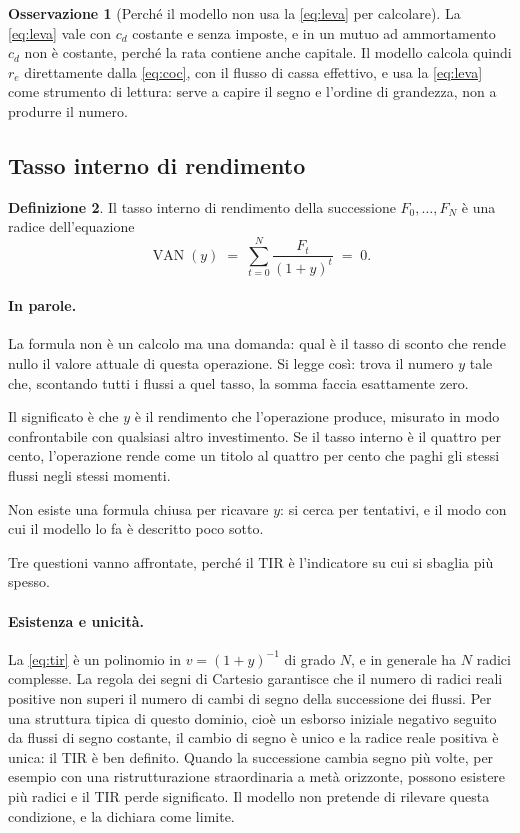 \documentclass[11pt,a4paper]{article}
\theoremstyle{definition}
\newtheorem{definizione}{Definizione}[section]
\newtheorem{osservazione}[definizione]{Osservazione}
\theoremstyle{plain}
\DeclareMathOperator{\VAN}{VAN}
\begin{document}
\begin{osservazione}[Perché il modello non usa la \eqref{eq:leva} per calcolare]
La \eqref{eq:leva} vale con $c_d$ costante e senza imposte, e in un mutuo ad ammortamento $c_d$ non è costante, perché la rata contiene anche capitale. Il modello calcola quindi $r_e$ direttamente dalla \eqref{eq:coc}, con il flusso di cassa effettivo, e usa la \eqref{eq:leva} come strumento di lettura: serve a capire il segno e l'ordine di grandezza, non a produrre il numero.
\end{osservazione}

\subsection{Tasso interno di rendimento}

\begin{definizione}
Il tasso interno di rendimento della successione $F_0,\dots,F_N$ è una radice dell'equazione
\begin{equation}
\VAN(y) \;=\; \sum_{t=0}^{N} \frac{F_t}{(1+y)^t} \;=\; 0 .
\label{eq:tir}
\end{equation}

\paragraph{In parole.} La formula non è un calcolo ma una domanda: qual è il tasso di sconto che rende nullo il valore attuale di questa operazione. Si legge così: trova il numero $y$ tale che, scontando tutti i flussi a quel tasso, la somma faccia esattamente zero.

Il significato è che $y$ è il rendimento che l'operazione produce, misurato in modo confrontabile con qualsiasi altro investimento. Se il tasso interno è il quattro per cento, l'operazione rende come un titolo al quattro per cento che paghi gli stessi flussi negli stessi momenti.

Non esiste una formula chiusa per ricavare $y$: si cerca per tentativi, e il modo con cui il modello lo fa è descritto poco sotto.
\end{definizione}

Tre questioni vanno affrontate, perché il TIR è l'indicatore su cui si sbaglia più spesso.

\paragraph{Esistenza e unicità.} La \eqref{eq:tir} è un polinomio in $v=(1+y)^{-1}$ di grado $N$, e in generale ha $N$ radici complesse. La regola dei segni di Cartesio garantisce che il numero di radici reali positive non superi il numero di cambi di segno della successione dei flussi. Per una struttura tipica di questo dominio, cioè un esborso iniziale negativo seguito da flussi di segno costante, il cambio di segno è unico e la radice reale positiva è unica: il TIR è ben definito. Quando la successione cambia segno più volte, per esempio con una ristrutturazione straordinaria a metà orizzonte, possono esistere più radici e il TIR perde significato. Il modello non pretende di rilevare questa condizione, e la dichiara come limite.
\end{document}
